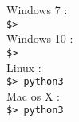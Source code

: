 Windows 7 :\\
\texttt{\$>  }\\
Windows 10 :\\
\texttt{\$>  }\\
Linux :\\
\texttt{\$> python3 }\\
Mac os X :\\
\texttt{\$> python3 }\\
